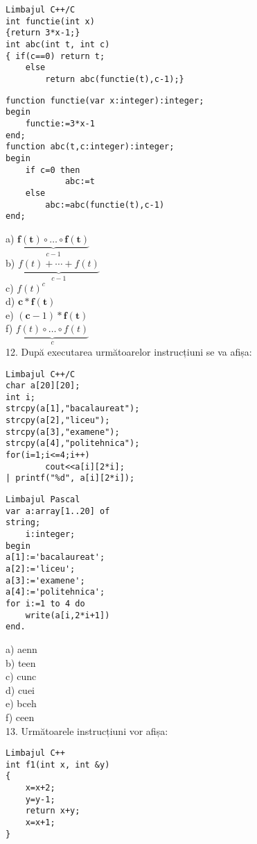 \begin{verbatim}
Limbajul C++/C
int functie(int x)
{return 3*x-1;}
int abc(int t, int c)
{ if(c==0) return t;
    else
        return abc(functie(t),c-1);}
\end{verbatim}



\begin{verbatim}
function functie(var x:integer):integer;
begin
    functie:=3*x-1
end;
function abc(t,c:integer):integer;
begin
    if c=0 then
            abc:=t
    else
        abc:=abc(functie(t),c-1)
end;
\end{verbatim}

a) $\underbrace{\boldsymbol{f}(\boldsymbol{t}) \circ \ldots \circ \boldsymbol{f}(\boldsymbol{t})}_{c-1}$\\
b) $\underbrace{f(t)+\cdots+f(t)}_{c-1}$\\
c) $f(t)^{c}$\\
d) $\boldsymbol{c} * \boldsymbol{f}(\boldsymbol{t})$\\
e) $(\boldsymbol{c}-1) * \boldsymbol{f}(\boldsymbol{t})$\\
f) $\underbrace{f(t) \circ \ldots \circ f(t)}_{c}$\\
12. După executarea următoarelor instrucțiuni se va afișa:

\begin{verbatim}
Limbajul C++/C
char a[20][20];
int i;
strcpy(a[1],"bacalaureat");
strcpy(a[2],"liceu");
strcpy(a[3],"examene");
strcpy(a[4],"politehnica");
for(i=1;i<=4;i++)
        cout<<a[i][2*i];
| printf("%d", a[i][2*i]);
\end{verbatim}

\begin{verbatim}
Limbajul Pascal
var a:array[1..20] of
string;
    i:integer;
begin
a[1]:='bacalaureat';
a[2]:='liceu';
a[3]:='examene';
a[4]:='politehnica';
for i:=1 to 4 do
    write(a[i,2*i+1])
end.
\end{verbatim}

a) aenn\\
b) teen\\
c) cunc\\
d) cuei\\
e) bceh\\
f) ceen\\
13. Următoarele instrucțiuni vor afișa:

\begin{verbatim}
Limbajul C++
int f1(int x, int &y)
{
    x=x+2;
    y=y-1;
    return x+y;
    x=x+1;
}
\end{verbatim}

